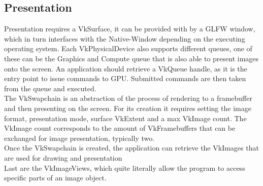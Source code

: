 \subsection{Presentation}
\label{sec:VkPrensentation}
Presentation requires a VkSurface, it can be provided with by a GLFW window, which in turn interfaces with the Native-Window depending on the executing operating system. Each VkPhysicalDevice also supports different queues, one of these can be the Graphics and Compute queue that is also able to present images onto the screen. An application should retrieve a VkQueue handle, as it is the entry point to issue commands to GPU. Submitted commands are then taken from the queue and executed.\\
The VkSwapchain is an abstraction of the process of rendering to a framebuffer and then presenting on the screen. For its creation it requires setting the image format, presentation mode, surface VkExtent and a max VkImage count. The VkImage count corresponds to the amount of VkFramebuffers that can be exchanged for image presentation, typically two.\\
Once the VkSwapchain is created, the application can retrieve the VkImages that are used for drawing and presentation\\
Last are the VkImageViews, which quite literally allow the program to access specific parts of an image object.
